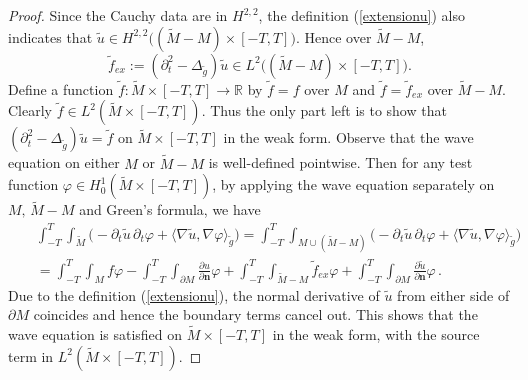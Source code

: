 \documentclass[11pt,letterpaper]{amsart}
\numberwithin{equation}{section}
\theoremstyle{definition}
\theoremstyle{plain}
\theoremstyle{definition}
\theoremstyle{plain}
\theoremstyle{definition}
\theoremstyle{plain}
\begin{document}
\begin{proof}
Since the Cauchy data are in $H^{2,2}$, the definition (\ref{extensionu}) also indicates that $\widetilde{u}\in H^{2,2}\big((\widetilde{M}-M)\times [-T,T]\big)$. Hence over $\widetilde{M}-M$,
$$\widetilde{f}_{ex}:=(\partial_{t}^2 -\Delta_{\widetilde{g}})\widetilde{u} \in L^2\big((\widetilde{M}-M) \times [-T,T]\big).$$
Define a function $\widetilde{f}:\widetilde{M}\times [-T,T]\to \mathbb{R}$ by $\widetilde{f}=f$ over $M$ and $\widetilde{f}=\widetilde{f}_{ex}$ over $\widetilde{M}-M$. Clearly $\widetilde{f}\in L^2(\widetilde{M}\times [-T,T])$. Thus the only part left is to show that $(\partial_{t}^2 -\Delta_{\widetilde{g}})\widetilde{u}=\widetilde{f}$ on $\widetilde{M}\times [-T,T]$ in the weak form. Observe that the wave equation on either $M$ or $\widetilde{M}-M$ is well-defined pointwise. Then for any test function $\varphi\in H_0^{1}(\widetilde{M}\times [-T,T])$, by applying the wave equation separately on $M,\,\widetilde{M}-M$ and Green's formula, we have
\begin{eqnarray*}
&&\int_{-T}^T \int_{\widetilde{M}} \Big(-\partial_{t} \widetilde{u}\, \partial_t \varphi  + \langle \nabla \widetilde{u},  \nabla \varphi \rangle_{\widetilde{g}} \Big) = \int_{-T}^T \int_{M\cup(\widetilde{M}-M)}  \Big(-\partial_{t} \widetilde{u}\, \partial_t \varphi  + \langle \nabla \widetilde{u},  \nabla \varphi \rangle_{\widetilde{g}} \Big) \\
&&= \int_{-T}^T \int_{M} f\varphi - \int_{-T}^T \int_{\partial M} \frac{\partial u}{\partial \mathbf{n}} \varphi+
 \int_{-T}^T \int_{\widetilde{M}-M}\widetilde{f}_{ex} \varphi+\int_{-T}^T \int_{\partial M} \frac{\partial \widetilde{u}}{\partial \mathbf{n}} \varphi\, .
\end{eqnarray*}
Due to the definition (\ref{extensionu}), the normal derivative of $\widetilde{u}$ from either side of $\partial M$ coincides and hence the boundary terms cancel out. This shows that the wave equation is satisfied on $\widetilde{M}\times[-T,T]$ in the weak form, with the source term in $L^2(\widetilde{M}\times[-T,T])$.
\end{proof}
\end{document}
